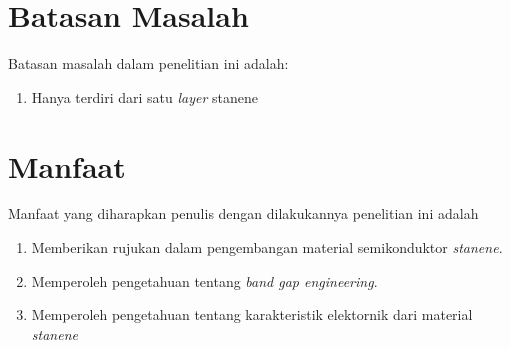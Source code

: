 \section{Batasan Masalah}

Batasan masalah dalam penelitian ini adalah:
\begin{enumerate}[noitemsep]
    \item Hanya terdiri dari satu \textit{layer} stanene
    
\end{enumerate}


\section{Manfaat}
Manfaat yang diharapkan penulis dengan dilakukannya penelitian ini adalah
\begin{enumerate}[noitemsep]
    \item Memberikan rujukan dalam pengembangan material semikonduktor \textit{stanene}.
    \item Memperoleh pengetahuan tentang \textit{band gap engineering}.
    \item Memperoleh pengetahuan tentang karakteristik elektornik dari material \textit{stanene}
\end{enumerate}


